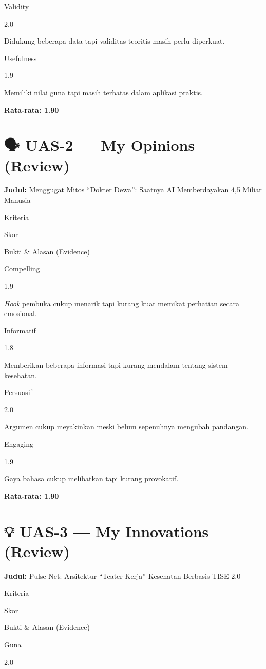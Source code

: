 \documentclass[
  letterpaper,
  DIV=11,
  numbers=noendperiod]{scrreprt}
\begin{document}
Validity

2.0

Didukung beberapa data tapi validitas teoritis masih perlu diperkuat.

Usefulness

1.9

Memiliki nilai guna tapi masih terbatas dalam aplikasi praktis.

\textbf{Rata-rata: 1.90}

\section{🗣️ UAS-2 --- My Opinions
(Review)}\label{uas-2-my-opinions-review}

\textbf{Judul:} Menggugat Mitos ``Dokter Dewa'': Saatnya AI
Memberdayakan 4,5 Miliar Manusia

Kriteria

Skor

Bukti \& Alasan (Evidence)

Compelling

1.9

\emph{Hook} pembuka cukup menarik tapi kurang kuat memikat perhatian
secara emosional.

Informatif

1.8

Memberikan beberapa informasi tapi kurang mendalam tentang sistem
kesehatan.

Persuasif

2.0

Argumen cukup meyakinkan meski belum sepenuhnya mengubah pandangan.

Engaging

1.9

Gaya bahasa cukup melibatkan tapi kurang provokatif.

\textbf{Rata-rata: 1.90}

\section{💡 UAS-3 --- My Innovations
(Review)}\label{uas-3-my-innovations-review}

\textbf{Judul:} Pulse-Net: Arsitektur ``Teater Kerja'' Kesehatan
Berbasis TISE 2.0

Kriteria

Skor

Bukti \& Alasan (Evidence)

Guna

2.0
\end{document}
